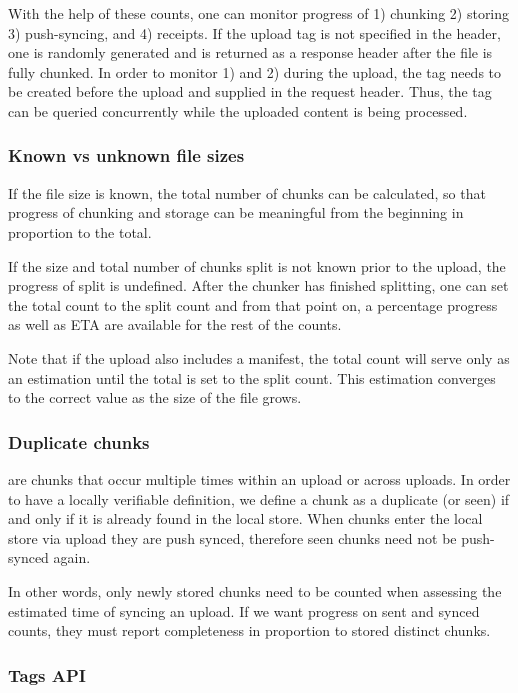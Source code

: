 With the help of these counts, one can monitor progress of 1) chunking 2) storing 3) push-syncing, and 4) receipts.
If the upload tag is not specified in the header, one is randomly generated and is returned as a response header after the file is fully chunked. In order to monitor 1) and  2) during the upload, the tag needs to be created before the upload and supplied in the request header. Thus, the tag can be queried concurrently while the uploaded content is being processed. 

\subsubsection{Known vs unknown file sizes}

If the file size is known, the total number of chunks can be calculated, so that progress of chunking and storage can be meaningful from the beginning in proportion to the total.

If the size and total number of chunks split is not known prior to the upload, the progress of split is undefined. After the chunker has finished splitting, one can set the total count to the split count and from that point on, a percentage progress as well as ETA are available for the rest of the counts.

Note that if the upload also includes a manifest, the total count will serve only as an estimation until the total is set to the split count. This estimation converges to the correct value as the size of the file grows.


\subsubsection{Duplicate chunks}

 are chunks that occur multiple times within an upload or across uploads. In order to have a locally verifiable definition, we define a chunk as a duplicate (or seen) if and only if it is already found in the local store.
When chunks enter the local store via upload they are push synced, therefore seen chunks need not be push-synced again.

In other words, only newly stored chunks need to be counted when assessing the estimated time of syncing an upload. If we want progress on sent and synced counts, they must report completeness in proportion to stored distinct chunks.

\subsubsection{Tags API} 

